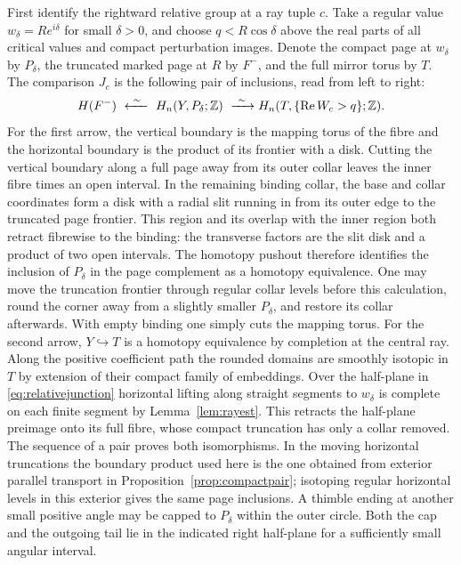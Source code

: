 First identify the rightward relative group at a ray tuple $c$. Take a regular value $w_\delta=Re^{i\delta}$ for small $\delta>0$, and choose $q<R\cos\delta$ above the real parts of all critical values and compact perturbation images. Denote the compact page at $w_\delta$ by $P_\delta$, the truncated marked page at $R$ by $F^-$, and the full mirror torus by $T$. The comparison $J_c$ is the following pair of inclusions, read from left to right:
\begin{equation}\label{eq:relativejunction}
 H(F^-)\ \xleftarrow{\ \sim\ }\ H_n(Y,P_\delta;\mathbb Z)\
       \xrightarrow{\ \sim\ } H_n(T,\{\operatorname{Re} W_c>q\};\mathbb Z).
\end{equation}
For the first arrow, the vertical boundary is the mapping torus of the fibre and the horizontal boundary is the product of its frontier with a disk. Cutting the vertical boundary along a full page away from its outer collar leaves the inner fibre times an open interval. In the remaining binding collar, the base and collar coordinates form a disk with a radial slit running in from its outer edge to the truncated page frontier. This region and its overlap with the inner region both retract fibrewise to the binding: the transverse factors are the slit disk and a product of two open intervals. The homotopy pushout therefore identifies the inclusion of $P_\delta$ in the page complement as a homotopy equivalence. One may move the truncation frontier through regular collar levels before this calculation, round the corner away from a slightly smaller $P_\delta$, and restore its collar afterwards. With empty binding one simply cuts the mapping torus. For the second arrow, $Y\hookrightarrow T$ is a homotopy equivalence by completion at the central ray. Along the positive coefficient path the rounded domains are smoothly isotopic in $T$ by extension of their compact family of embeddings. Over the half-plane in \eqref{eq:relativejunction} horizontal lifting along straight segments to $w_\delta$ is complete on each finite segment by Lemma~\ref{lem:rayest}. This retracts the half-plane preimage onto its full fibre, whose compact truncation has only a collar removed. The sequence of a pair proves both isomorphisms. In the moving horizontal truncations the boundary product used here is the one obtained from exterior parallel transport in Proposition~\ref{prop:compactpair}; isotoping regular horizontal levels in this exterior gives the same page inclusions. A thimble ending at another small positive angle may be capped to $P_\delta$ within the outer circle. Both the cap and the outgoing tail lie in the indicated right half-plane for a sufficiently small angular interval.

